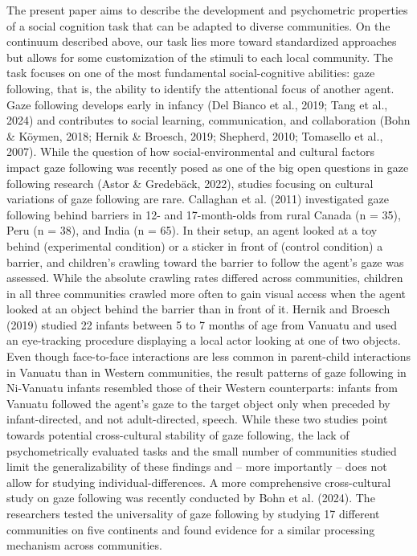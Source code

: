 \documentclass[
  man,floatsintext]{apa7}
\begin{document}
The present paper aims to describe the development and psychometric properties of a social cognition task that can be adapted to diverse communities.
On the continuum described above, our task lies more toward standardized approaches but allows for some customization of the stimuli to each local community.
The task focuses on one of the most fundamental social-cognitive abilities: gaze following, that is, the ability to identify the attentional focus of another agent.
Gaze following develops early in infancy (Del Bianco et al., 2019; Tang et al., 2024) and contributes to social learning, communication, and collaboration (Bohn \& Köymen, 2018; Hernik \& Broesch, 2019; Shepherd, 2010; Tomasello et al., 2007).
While the question of how social-environmental and cultural factors impact gaze following was recently posed as one of the big open questions in gaze following research (Astor \& Gredebäck, 2022), studies focusing on cultural variations of gaze following are rare.
Callaghan et al. (2011) investigated gaze following behind barriers in 12- and 17-month-olds from rural Canada (n = 35), Peru (n = 38), and India (n = 65).
In their setup, an agent looked at a toy behind (experimental condition) or a sticker in front of (control condition) a barrier, and children's crawling toward the barrier to follow the agent's gaze was assessed.
While the absolute crawling rates differed across communities, children in all three communities crawled more often to gain visual access when the agent looked at an object behind the barrier than in front of it.
Hernik and Broesch (2019) studied 22 infants between 5 to 7 months of age from Vanuatu and used an eye-tracking procedure displaying a local actor looking at one of two objects.
Even though face-to-face interactions are less common in parent-child interactions in Vanuatu than in Western communities, the result patterns of gaze following in Ni-Vanuatu infants resembled those of their Western counterparts: infants from Vanuatu followed the agent's gaze to the target object only when preceded by infant-directed, and not adult-directed, speech.
While these two studies point towards potential cross-cultural stability of gaze following, the lack of psychometrically evaluated tasks and the small number of communities studied limit the generalizability of these findings and -- more importantly -- does not allow for studying individual-differences.
A more comprehensive cross-cultural study on gaze following was recently conducted by Bohn et al. (2024). The researchers tested the universality of gaze following by studying 17 different communities on five continents and found evidence for a similar processing mechanism across communities.
\end{document}
